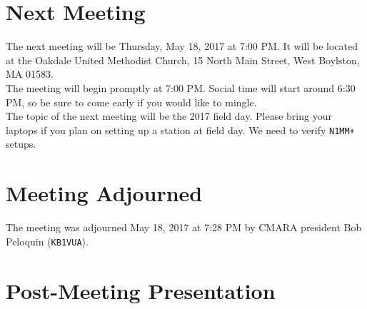 \documentclass[10pt,letterpaper]{article}
\begin{document}
\section{Next Meeting}
The next meeting will be Thursday, May 18, 2017 at 7:00 PM. It will be located at the Oakdale United Methodist Church, 15 North Main Street, West Boylston, MA 01583.\\

\noindent
The meeting will begin promptly at 7:00 PM. Social time will start around 6:30 PM, so be sure to come early if you would like to mingle.\\

\noindent
The topic of the next meeting will be the 2017 field day. Please bring your laptops if you plan on setting up a station at field day. We need to verify \texttt{N1MM+} setups.

\section{Meeting Adjourned}
The meeting was adjourned May 18, 2017 at 7:28 PM by CMARA president Bob Peloquin (\texttt{KB1VUA}).

\section{Post-Meeting Presentation}
\end{document}
